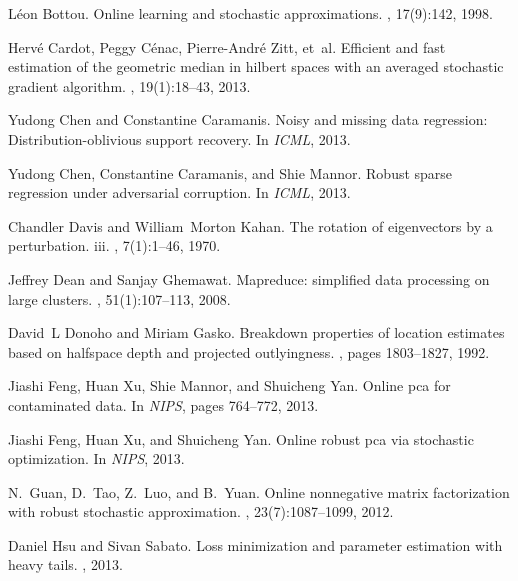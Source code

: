 \documentclass[11pt]{article}
\begin{document}
\begin{thebibliography}{10}
	
	L{\'e}on Bottou.
	\newblock Online learning and stochastic approximations.
	, 17(9):142, 1998.
	
	Herv{\'e} Cardot, Peggy C{\'e}nac, Pierre-Andr{\'e} Zitt, et~al.
	\newblock Efficient and fast estimation of the geometric median in hilbert
	spaces with an averaged stochastic gradient algorithm.
	, 19(1):18--43, 2013.
	
	Yudong Chen and Constantine Caramanis.
	\newblock Noisy and missing data regression: Distribution-oblivious support
	recovery.
	\newblock In {\em ICML}, 2013.
	
	Yudong Chen, Constantine Caramanis, and Shie Mannor.
	\newblock Robust sparse regression under adversarial corruption.
	\newblock In {\em ICML}, 2013.
	
	Chandler Davis and William~Morton Kahan.
	\newblock The rotation of eigenvectors by a perturbation. iii.
	, 7(1):1--46, 1970.
	
	Jeffrey Dean and Sanjay Ghemawat.
	\newblock Mapreduce: simplified data processing on large clusters.
	, 51(1):107--113, 2008.
	
	David~L Donoho and Miriam Gasko.
	\newblock Breakdown properties of location estimates based on halfspace depth
	and projected outlyingness.
	, pages 1803--1827, 1992.
	
	Jiashi Feng, Huan Xu, Shie Mannor, and Shuicheng Yan.
	\newblock Online pca for contaminated data.
	\newblock In {\em NIPS}, pages 764--772, 2013.
	
	Jiashi Feng, Huan Xu, and Shuicheng Yan.
	\newblock Online robust pca via stochastic optimization.
	\newblock In {\em NIPS}, 2013.
	
	N.~Guan, D.~Tao, Z.~Luo, and B.~Yuan.
	\newblock Online nonnegative matrix factorization with robust stochastic
	approximation.
	,
	23(7):1087--1099, 2012.
	
	Daniel Hsu and Sivan Sabato.
	\newblock Loss minimization and parameter estimation with heavy tails.
	, 2013.
	

\end{thebibliography}
\end{document}
